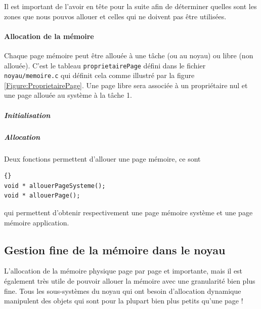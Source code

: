    Il est important de l'avoir en tête pour la suite afin de
déterminer quelles sont les zones que nous pouvos allouer et celles
qui ne doivent pas être utilisées.

%
%
%
\paragraph{Allocation de la mémoire}

   Chaque page mémoire peut être allouée à une tâche (ou au noyau) ou
libre (non allouée). C'est le tableau \lstinline!proprietairePage!
défini dans le fichier {\tt noyau/memoire.c} qui définit cela comme illustré par la figure
\ref{Figure:ProprietairePage}. Une page libre sera associée à un
propriétaire nul et une page allouée au système à la tâche 1.

\subparagraph{Initialisation}



\subparagraph{Allocation}

   Deux fonctions permettent d'allouer une page mémoire, ce sont

\begin{lstlisting}{}
void * allouerPageSysteme();
void * allouerPage();
\end{lstlisting}

   qui permettent d'obtenir respectivement une page mémoire système et
une page mémoire application.

%
\subsection{Gestion fine de la mémoire dans le noyau}

   L'allocation de la mémoire physique page par page et importante,
mais il est également très utile de pouvoir allouer la mémoire avec
une granularité bien plus fine. Tous les sous-systèmes du noyau qui
ont besoin d'allocation dynamique manipulent des objets qui sont pour
la plupart bien plus petits qu'une page !


